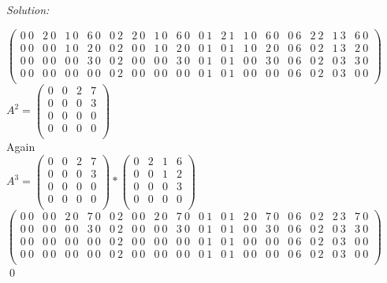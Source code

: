 \documentclass[12pt]{article}
\newenvironment{sol}
    {\emph{Solution:}
    }
    {
    \qed
    }
\begin{document}
\begin{sol}
$\left(
\begin{array}{cccccccccccccccc}
 0\ 0 & 2\ 0 & 1\ 0 & 6\ 0 & 0\ 2 & 2\ 0 & 1\ 0 & 6\ 0 & 0\ 1 & 2\ 1 & 1\ 0 & 6\ 0 & 0\ 6 & 2\ 2 & 1\ 3 & 6\ 0 \\
 0\ 0 & 0\ 0 & 1\ 0 & 2\ 0 & 0\ 2 & 0\ 0 & 1\ 0 & 2\ 0 & 0\ 1 & 0\ 1 & 1\ 0 & 2\ 0 & 0\ 6 & 0\ 2 & 1\ 3 & 2\ 0 \\
 0\ 0 & 0\ 0 & 0\ 0 & 3\ 0 & 0\ 2 & 0\ 0 & 0\ 0 & 3\ 0 & 0\ 1 & 0\ 1 & 0\ 0 & 3\ 0 & 0\ 6 & 0\ 2 & 0\ 3 & 3\ 0 \\
 0\ 0 & 0\ 0 & 0\ 0 & 0\ 0 & 0\ 2 & 0\ 0 & 0\ 0 & 0\ 0 & 0\ 1 & 0\ 1 & 0\ 0 & 0\ 0 & 0\ 6 & 0\ 2 & 0\ 3 & 0\ 0 \\
\end{array}
\right)$\\


$A^{2}= \left(
\begin{array}{cccc}
 0 & 0 & 2 & 7 \\
 0 & 0 & 0 & 3 \\
 0 & 0 & 0 & 0 \\
 0 & 0 & 0 & 0 \\
\end{array}
\right)$ \\

Again \\

$A^{3}= \left(
\begin{array}{cccc}
 0 & 0 & 2 & 7 \\
 0 & 0 & 0 & 3 \\
 0 & 0 & 0 & 0 \\
 0 & 0 & 0 & 0 \\
\end{array}
\right)*\left(
\begin{array}{cccc}
 0 & 2 & 1 & 6 \\
 0 & 0 & 1 & 2 \\
 0 & 0 & 0 & 3 \\
 0 & 0 & 0 & 0 \\
\end{array}
\right)$ \\

$\left(
\begin{array}{cccccccccccccccc}
 0\ 0 & 0\ 0 & 2\ 0 & 7\ 0 & 0\ 2 & 0\ 0 & 2\ 0 & 7\ 0 & 0\ 1 & 0\ 1 & 2\ 0 & 7\ 0 & 0\ 6 & 0\ 2 & 2\ 3 & 7\ 0 \\
 0\ 0 & 0\ 0 & 0\ 0 & 3\ 0 & 0\ 2 & 0\ 0 & 0\ 0 & 3\ 0 & 0\ 1 & 0\ 1 & 0\ 0 & 3\ 0 & 0\ 6 & 0\ 2 & 0\ 3 & 3\ 0 \\
 0\ 0 & 0\ 0 & 0\ 0 & 0\ 0 & 0\ 2 & 0\ 0 & 0\ 0 & 0\ 0 & 0\ 1 & 0\ 1 & 0\ 0 & 0\ 0 & 0\ 6 & 0\ 2 & 0\ 3 & 0\ 0 \\
 0\ 0 & 0\ 0 & 0\ 0 & 0\ 0 & 0\ 2 & 0\ 0 & 0\ 0 & 0\ 0 & 0\ 1 & 0\ 1 & 0\ 0 & 0\ 0 & 0\ 6 & 0\ 2 & 0\ 3 & 0\ 0 \\
\end{array}
\right)$ \\



\end{sol}
\end{document}
